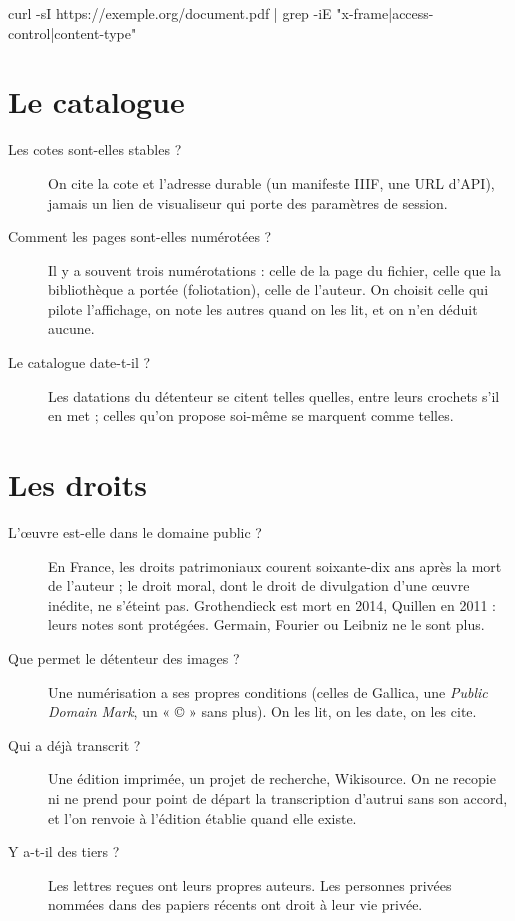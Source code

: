 \begin{terminal}
curl -sI https://exemple.org/document.pdf | grep -iE "x-frame|access-control|content-type"
\end{terminal}

\section{Le catalogue}

\begin{description}
  \item[Les cotes sont-elles stables ?] On cite la cote et l'adresse durable (un manifeste
        IIIF, une URL d'API), jamais un lien de visualiseur qui porte des paramètres de
        session.
  \item[Comment les pages sont-elles numérotées ?] Il y a souvent trois numérotations : celle
        de la page du fichier, celle que la bibliothèque a portée (foliotation), celle de
        l'auteur. On choisit celle qui pilote l'affichage, on note les autres quand on les
        lit, et on n'en déduit aucune.
  \item[Le catalogue date-t-il ?] Les datations du détenteur se citent telles quelles, entre
        leurs crochets s'il en met ; celles qu'on propose soi-même se marquent comme telles.
\end{description}

\section{Les droits}

\begin{description}
  \item[L'œuvre est-elle dans le domaine public ?] En France, les droits patrimoniaux
        courent soixante-dix ans après la mort de l'auteur ; le droit moral, dont le droit
        de divulgation d'une œuvre inédite, ne s'éteint pas. Grothendieck est mort en 2014,
        Quillen en 2011 : leurs notes sont protégées. Germain, Fourier ou Leibniz ne le sont
        plus.
  \item[Que permet le détenteur des images ?] Une numérisation a ses propres conditions
        (celles de Gallica, une \emph{Public Domain Mark}, un « © » sans plus). On les lit,
        on les date, on les cite.
  \item[Qui a déjà transcrit ?] Une édition imprimée, un projet de recherche, Wikisource. On
        ne recopie ni ne prend pour point de départ la transcription d'autrui sans son
        accord, et l'on renvoie à l'édition établie quand elle existe.
  \item[Y a-t-il des tiers ?] Les lettres reçues ont leurs propres auteurs. Les personnes
        privées nommées dans des papiers récents ont droit à leur vie privée.
\end{description}

